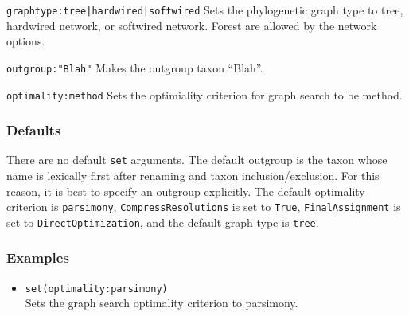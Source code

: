 \documentclass[11pt]{article}
\begin{document}
			\smallskip
			\noindent \texttt{graphtype:tree|hardwired|softwired} Sets the phylogenetic graph type to tree, hardwired network, or softwired network.  Forest are allowed 
			by the network options.
			
			\smallskip
			\noindent \texttt{outgroup:"Blah"} Makes the outgroup taxon ``Blah''. 
			
			\smallskip
			\noindent \texttt{optimality:method} Sets the optimiality criterion for graph search to be method.
				
		\subsubsection{Defaults} 
		There are no default \texttt{set} arguments.  The default outgroup is the taxon whose name  is lexically first after
		renaming and taxon inclusion/exclusion. For this reason, it is best to specify an outgroup explicitly.
		The default optimality criterion is \texttt{parsimony}, \texttt{CompressResolutions} is set to \texttt{True}, \texttt{FinalAssignment} is set to \texttt{DirectOptimization}, and the default graph type is \texttt{tree}.
		\subsubsection{Examples}
			\begin{itemize}
					\item{\texttt{set(optimality:parsimony)}\\Sets the graph search optimality criterion to parsimony.}
			\end{itemize}
		
\end{document}
